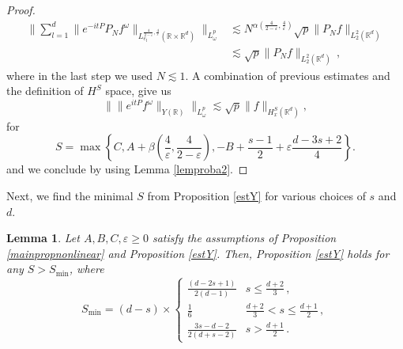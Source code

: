 \documentclass[10pt,leqno]{amsart}
\newtheorem{lem}[thm]{Lemma}
\newcommand{\R}{\mathbb{R}}
\numberwithin{equation}{section}
\begin{document}
\begin{proof}
\begin{align*}
\Big\|\sum_{l=1}^d \|e^{-it P}  P_N f^\omega \|_{ L^{\frac{4}{2-\varepsilon},\frac{4}{\varepsilon}}_{e_l} (\R\times \R^d)} \Big\|_{L^p_\omega} 
&\lesssim  N^{\alpha (\frac{4}{2-\varepsilon},\frac{4}{\varepsilon} ) } \sqrt{p} \|P_N f\|_{L_2^2 (\R^d )}  \\
&\lesssim \sqrt{p} \|P_N f\|_{L_2^2 (\R^d )} \,,
\end{align*}
where in the last step we used $N \lesssim 1$.
A combination of previous estimates and the definition of $H^S$ space, give us
$$\| \|e^{itP}f^\omega \|_{Y(\R)} \|_{L^p_\omega} \lesssim \sqrt{p} \|f\|_{H_x^S (\R^d )}, $$
for 
$$S=\max \left\{C, A+\beta \left(\frac{4}{\varepsilon} , \frac{4}{2-\varepsilon}\right), -B+\frac{s-1}{2} + \varepsilon  \frac{d -3s+2}{4}  \right\}.$$
and we conclude by using Lemma \ref{lemproba2}.
\end{proof}

Next, we find the minimal $S$ from Proposition \ref{estY} for various choices of $s$ and $d$. 

\begin{lem}
\label{lastmainlem}
Let $A, B, C, \varepsilon \geq 0$ satisfy the assumptions of Proposition \ref{mainpropnonlinear} and Proposition \ref{estY}. Then, Proposition \ref{estY} holds for any $S > S_{\min}$, where
\begin{equation}
S_{\min} = (d - s)\times
\begin{cases}
 \frac{(d - 2s + 1)}{2(d - 1)}  & s \leq \frac{d + 2}{3} \,, \\
\frac{1}{6} & \frac{d + 2}{3} <  s \leq \frac{d + 1}{2} \,, \\
 \frac{3s - d - 2}{2(d + s - 2)}  & s  >  \frac{d + 1}{2} \,. 
\end{cases}
\end{equation}
\end{lem}
\end{document}
